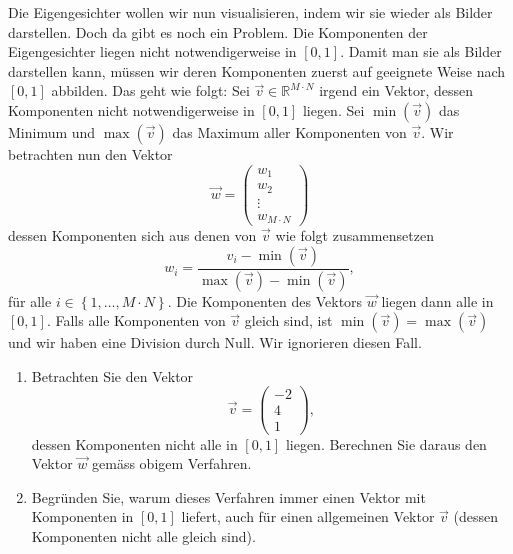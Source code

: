Die Eigengesichter wollen wir nun visualisieren, indem wir sie wieder als Bilder darstellen.
Doch da gibt es noch ein Problem.
Die Komponenten der Eigengesichter liegen nicht notwendigerweise in $\left[0,1\right]$.
Damit man sie als Bilder darstellen kann, müssen wir deren Komponenten zuerst auf geeignete Weise nach $\left[0,1\right]$ abbilden.
Das geht wie folgt:
Sei $\vec v\in\mathbb R^{M\cdot N}$ irgend ein Vektor, dessen Komponenten nicht notwendigerweise in $\left[0,1\right]$ liegen.
Sei $\min\left(\vec v\right)$ das Minimum und $\max\left(\vec v\right)$ das Maximum aller Komponenten von $\vec v$.
Wir betrachten nun den Vektor
\begin{equation*}
	\vec w=
	\begin{pmatrix}
		w_1 \\
		w_2 \\
		\vdots \\
		w_{M\cdot N}
	\end{pmatrix}
\end{equation*}
dessen Komponenten sich aus denen von $\vec v$ wie folgt zusammensetzen
\begin{equation*}
	w_i=\frac{v_i-\min\left(\vec v\right)}{\max\left(\vec v\right)-\min\left(\vec v\right)},
\end{equation*}
für alle $i\in\left\{1,\ldots,M\cdot N\right\}$.
Die Komponenten des Vektors $\vec w$ liegen dann alle in $\left[0,1\right]$.
Falls alle Komponenten von $\vec v$ gleich sind, ist $\min\left(\vec v\right)=\max\left(\vec v\right)$ und wir haben eine Division durch Null.
Wir ignorieren diesen Fall.
\begin{aufgabe} \label{aufg:scaling_theory}
	\phantom{text}
	\begin{enumerate}[label=(\alph*)]
		\item Betrachten Sie den Vektor
		\begin{equation*}
			\vec v=
			\begin{pmatrix}
				-2 \\
				4 \\
				1
			\end{pmatrix},
		\end{equation*}
		dessen Komponenten nicht alle in $\left[0,1\right]$ liegen.
		Berechnen Sie daraus den Vektor $\vec w$ gemäss obigem Verfahren.
		\item Begründen Sie, warum dieses Verfahren immer einen Vektor mit Komponenten in $\left[0,1\right]$ liefert, auch für einen allgemeinen Vektor $\vec v$ (dessen Komponenten nicht alle gleich sind).
	\end{enumerate}
\end{aufgabe}
